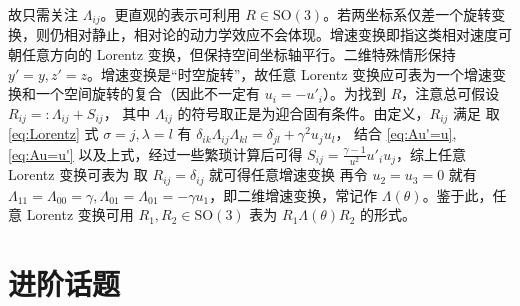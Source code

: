 故只需关注 $\Lambda_{ij}$。更直观的表示可利用 $R\in\mathrm{SO}(3)$。若两坐标系仅差一个旋转变换，则仍相对静止，相对论的动力学效应不会体现。增速变换即指这类相对速度可朝任意方向的 Lorentz 变换，但保持空间坐标轴平行。二维特殊情形保持 $y'=y,z'=z$。增速变换是“时空旋转”，故任意 Lorentz 变换应可表为一个增速变换和一个空间旋转的复合（因此不一定有 $u_i=-u'_i$）。为找到 $R$，注意总可假设
$R_{ij}=:\Lambda_{ij}+S_{ij}$，
其中 $\Lambda_{ij}$ 的符号取正是为迎合固有条件。由定义，$R_{ij}$ 满足
取 \eqref{eq:Lorentz} 式 $\sigma=j,\lambda=l$ 有 $\delta_{ik}\Lambda_{ij}\Lambda_{kl}=\delta_{jl}+ \gamma^2 u_j u_l$，
结合 \eqref{eq:Au'=u},\eqref{eq:Au=u'} 以及上式，经过一些繁琐计算后可得 $S_{ij}=\frac{\gamma-1}{u^2}u'_i u_j$，综上任意 Lorentz 变换可表为
取 $R_{ij}=\delta_{ij}$ 就可得任意增速变换
再令 $u_2=u_3=0$ 就有 $\Lambda_{11}=\Lambda_{00}=\gamma, \Lambda_{01}=\Lambda_{01}=-\gamma u_1$，即二维增速变换，常记作 $\Lambda(\theta)$。鉴于此，任意 Lorentz 变换可用 $R_{1},R_{2}\in\mathrm{SO}(3)$ 表为 $R_{1} \Lambda(\theta) R_{2}$ 的形式。

\section{进阶话题}

